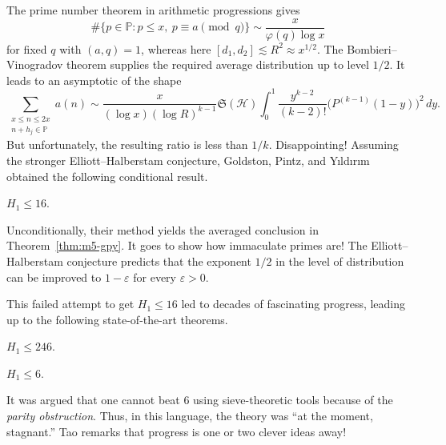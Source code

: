 \documentclass[11pt,a4paper]{article}
\begin{document}
The prime number theorem in arithmetic progressions gives
\[
 \#\{p\in\mathbb P:p\le x,\ p\equiv a\pmod q\}
 \sim\frac{x}{\varphi(q)\log x}
\]
for fixed $q$ with $(a,q)=1$, whereas here
$[d_1,d_2]\lesssim R^2\approx x^{1/2}$. The Bombieri--Vinogradov theorem
supplies the required average distribution up to level $1/2$. It leads to
an asymptotic of the shape
\[
 \sum_{\substack{x\le n\le2x\\n+h_j\in\mathbb P}}a(n)
 \sim
 \frac{x}{(\log x)(\log R)^{k-1}}\mathfrak S(\mathcal H)
 \int_0^1\frac{y^{k-2}}{(k-2)!}\bigl(P^{(k-1)}(1-y)\bigr)^2\,dy.
\]
But unfortunately, the resulting ratio is less than $1/k$. Disappointing!
Assuming the stronger
Elliott--Halberstam conjecture, Goldston, Pintz, and Y{\i}ld{\i}r{\i}m obtained
the following conditional result.
\setcounter{theorem}{21}\begin{theorem}
$H_1\le16$.
\end{theorem}
Unconditionally, their method yields the averaged conclusion in
Theorem~\ref{thm:m5-gpy}. It goes to show how immaculate primes are!
The Elliott--Halberstam conjecture predicts that
the exponent $1/2$ in the level of distribution can be improved to
$1-\varepsilon$ for every $\varepsilon>0$.

This failed attempt to get $H_1\le16$ led to decades of fascinating
progress, leading up to the following state-of-the-art theorems.
\setcounter{theorem}{22}\begin{theorem}[Polymath]
$H_1\le246$.
\end{theorem}
\setcounter{theorem}{23}\begin{theorem}
$H_1\le6$.
\end{theorem}
It was argued that one cannot beat $6$ using sieve-theoretic tools because
of the \emph{parity obstruction}. Thus, in this language, the
theory was ``at the moment, stagnant.'' Tao remarks that progress is one or
two clever ideas away!
\end{document}
